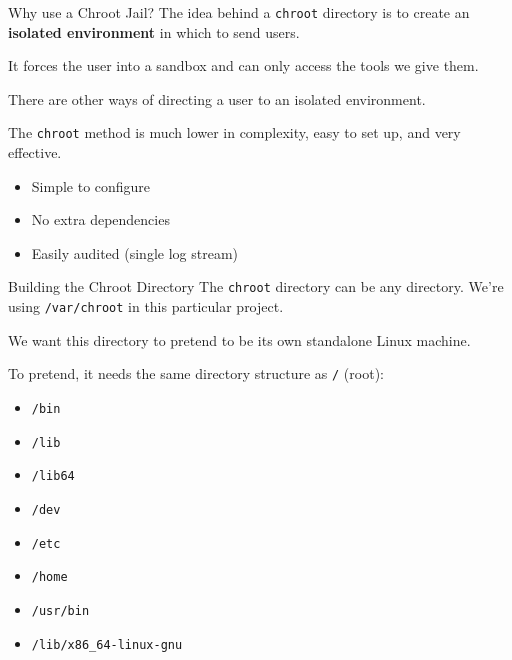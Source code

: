 \documentclass[14pt,compress,dvipsnames,aspectratio=169]{beamer} %
\begin{document}
\begin{frame}{Why use a Chroot Jail?}
    The idea behind a \texttt{chroot} directory is to create an \textbf{isolated
    environment} in which to send users.   

    \vspace{0.25cm}
    It forces the user into a sandbox and can only access the tools we give them.  

    \vspace{0.25cm}
    There are other ways of directing a user to an isolated environment.  

    \vspace{0.25cm}
    The \texttt{chroot} method is much lower in complexity, easy to set up, and very effective.  
    \begin{itemize}
        \item Simple to configure
        \item No extra dependencies
        \item Easily audited (single log stream)
    \end{itemize}
\end{frame}





\begin{frame}{Building the Chroot Directory}
    The \texttt{chroot} directory can be any directory. We're using
    \texttt{/var/chroot} in this particular project.

    We want this directory to pretend to be its own standalone Linux machine.  

    To pretend, it needs the same directory structure as \texttt{/} (root):  
    \begin{itemize}
        \item{\texttt{/bin}} 
        \item{\texttt{/lib}} 
        \item{\texttt{/lib64}} 
        \item{\texttt{/dev}} 
        \item{\texttt{/etc}} 
        \item{\texttt{/home}} 
        \item{\texttt{/usr/bin}} 
        \item{\texttt{/lib/x86\_64-linux-gnu}} 
    \end{itemize}
\end{frame}
\end{document}
